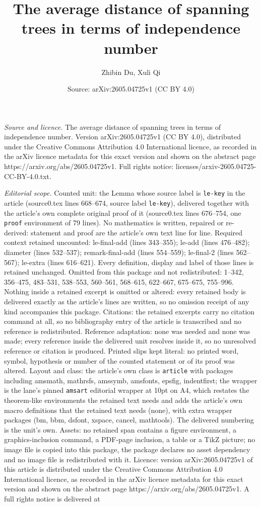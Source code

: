 \documentclass[10pt,a4paper]{amsart}
\title[The average distance of spanning trees in terms of independe]{The average distance of spanning trees in terms of independence number}
\author{Zhibin Du, Xuli Qi}
\date{Source: arXiv:2605.04725v1 (CC BY 4.0)}
\begin{document}
\maketitle

\noindent\emph{Source and licence.} The average distance of spanning trees in terms of independence number. Version arXiv:2605.04725v1 (CC BY 4.0), distributed under the Creative Commons Attribution 4.0 International licence, as recorded in the arXiv licence metadata for this exact version and shown on the abstract page https://arxiv.org/abs/2605.04725v1. Full rights notice: licenses/arxiv-2605.04725-CC-BY-4.0.txt.\par\smallskip

\noindent\textit{Editorial scope.} Counted unit: the Lemma whose source label is \texttt{le-key} in the article (source0.tex lines 668--674, source label \texttt{le-key}), delivered together with the article's own complete original proof of it (source0.tex lines 676--754, one \texttt{proof} environment of 79 lines). No mathematics is written, repaired or re-derived: statement and proof are the article's own text line for line. Required context retained uncounted: le-final-add (lines 343--355); le-add (lines 476--482); diameter (lines 532--537); remark-final-add (lines 554--559); le-final-2 (lines 562--567); le-extra (lines 616--621). Every definition, display and label of those lines is retained unchanged. Omitted from this package and not redistributed: 1--342, 356--475, 483--531, 538--553, 560--561, 568--615, 622--667, 675--675, 755--996. Nothing inside a retained excerpt is omitted or altered: every retained body is delivered exactly as the article's lines are written, so no omission receipt of any kind accompanies this package. Citations: the retained excerpts carry no citation command at all, so no bibliography entry of the article is transcribed and no reference is redistributed. Reference adaptation: none was needed and none was made; every reference inside the delivered unit resolves inside it, so no unresolved reference or citation is produced. Printed slips kept literal: no printed word, symbol, hypothesis or number of the counted statement or of its proof was altered. Layout and class: the article's own class is \texttt{article} with packages including amsmath, mathrsfs, amssymb, amsfonts, epsfig, indentfirst; the wrapper is the lane's pinned \texttt{amsart} editorial wrapper at 10pt on A4, which restates the theorem-like environments the retained text needs and adds the article's own macro definitions that the retained text needs (none), with extra wrapper packages (bm, bbm, dsfont, xspace, cancel, mathtools). The delivered numbering is the unit's own. Assets: no retained span contains a figure environment, a graphics-inclusion command, a PDF-page inclusion, a table or a TikZ picture; no image file is copied into this package, the package declares no asset dependency and no image file is redistributed with it. Licence: version arXiv:2605.04725v1 of this article is distributed under the Creative Commons Attribution 4.0 International licence, as recorded in the arXiv licence metadata for this exact version and shown on the abstract page https://arxiv.org/abs/2605.04725v1. A full rights notice is delivered at 
\end{document}
